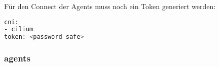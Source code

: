 Für den Connect der Agents muss noch ein Token generiert werden:
\begin{lstlisting}[language=bash, caption=rke2 server token,captionpos=b,label={lst:rke2-server-token},breaklines=true]
cni:
- cilium
token: <password safe>
\end{lstlisting}

\subsubsection{agents}

